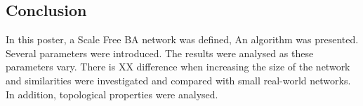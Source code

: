 \documentclass[a0,final]{a0poster}
\begin{document}
\begin{multicols}{3}
\section{Conclusion}
In this poster, a Scale Free BA network was defined, An algorithm was presented. Several parameters were introduced. The results were analysed as these parameters vary. There is XX difference when increasing the size of the network and similarities were investigated and compared with small real-world networks. In addition, topological properties were analysed. 




\end{multicols}
\end{document}
